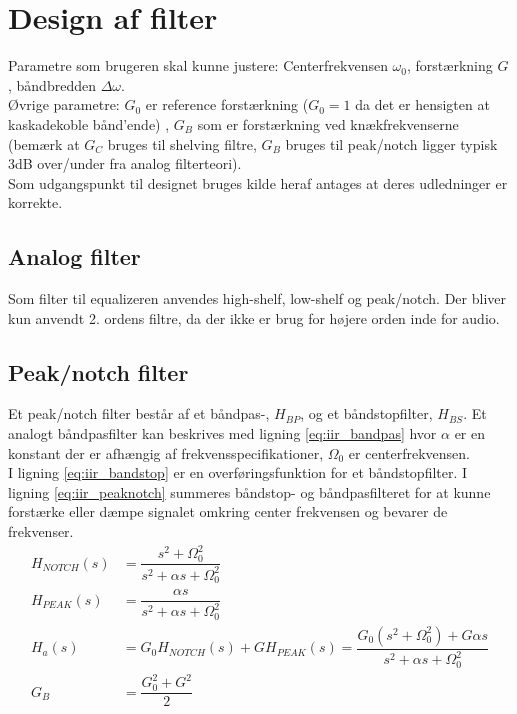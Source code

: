 \section{Design af filter}\label{sec:design_filter}
    Parametre som brugeren skal kunne justere: Centerfrekvensen $\omega_0$,  forstærkning $G$,  båndbredden $\Delta \omega$.\\
    Øvrige parametre:
    $G_0$ er reference forstærkning ($G_0=1$ da det er hensigten at kaskadekoble bånd'ende) , $G_B$ som er forstærkning ved knækfrekvenserne (bemærk at $G_C$ bruges til shelving filtre, $G_B$ bruges til peak/notch ligger typisk 3dB over/under fra analog filterteori).
\\
    Som udgangspunkt til designet bruges kilde \cite{Orfanidis1996} heraf antages at deres udledninger er korrekte.


    \subsection{Analog filter}

	Som filter til equalizeren anvendes high-shelf, low-shelf og  peak/notch.
    Der bliver kun anvendt 2. ordens filtre, da der ikke er brug for højere orden inde for audio.



     \subsection{Peak/notch filter}

    Et peak/notch filter består af et båndpas-, $H_{BP}$, og et båndstopfilter, $H_{BS}$. 
    Et analogt båndpasfilter kan beskrives med ligning \ref{eq:iir_bandpas} 
    hvor $\alpha$ er en konstant der er afhængig af frekvensspecifikationer, $\Omega_0$ er centerfrekvensen.\\
    I ligning \ref{eq:iir_bandstop} er en overføringsfunktion for et båndstopfilter.
    I ligning \ref{eq:iir_peaknotch} summeres båndstop- og båndpasfilteret for at kunne forstærke eller dæmpe signalet omkring center frekvensen og bevarer de frekvenser.    
     \begin{align}
     H_{NOTCH}(s) &= \dfrac{s^2 + \Omega_0^2}{s^2 + \alpha s + \Omega_0^2}
     \label{eq:iir_bandpas} \\
     H_{PEAK} (s) &= \dfrac{\alpha s}{s^2 + \alpha s + \Omega_0^2}  
     \label{eq:iir_bandstop} \\
     H_a (s) &= G_0 H_{NOTCH} (s) + G H_{PEAK} (s) = \dfrac{G_0 (s^2 + \Omega_0^2) + G \alpha s}{s^2 + \alpha s + \Omega_0^2}
     \label{eq:iir_peaknotch}\\
    G_B &= \dfrac{G_0^2 + G^2}{2} \label{eq:iir_gain}
    \end{align}

